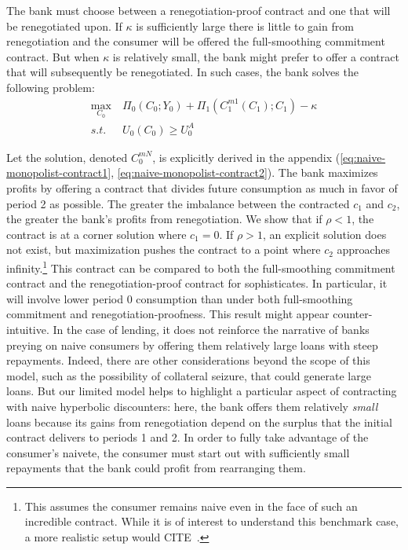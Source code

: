 \documentclass[11pt,english]{article}
\theoremstyle{plain}
\theoremstyle{definition}
\begin{document}
The bank must choose between a renegotiation-proof contract and one
that will be renegotiated upon. If $\kappa$ is sufficiently large
there is little to gain from renegotiation and the consumer will be
offered the full-smoothing commitment contract. But when $\kappa$
is relatively small, the bank might prefer to offer a contract that
will subsequently be renegotiated. In such cases, the bank solves
the following problem:
\begin{eqnarray}
\underset{C_{0}}{\text{max}} & \ \Pi_{0}\left(C_{0};Y_{0}\right)+\Pi_{1}\left(C_{1}^{m1}\left(C_{1}\right);C_{1}\right)-\kappa\\
s.t. & \ U_{0}\left(C_{0}\right)\geq U_{0}^{A}\label{eq:pc-n}
\end{eqnarray}

Let the solution, denoted $C_{0}^{mN}$, is explicitly derived
in the appendix (\ref{eq:naive-monopolist-contract1}, \ref{eq:naive-monopolist-contract2}).
The bank maximizes profits by offering a contract that divides future
consumption as much in favor of period 2 as possible. The greater
the imbalance between the contracted $c_{1}$ and $c_{2}$, the greater
the bank's profits from renegotiation. We show that if $\rho<1$,
the contract is at a corner solution where $c_{1}=0$. If $\rho>1$,
an explicit solution does not exist, but maximization pushes the contract
to a point where $c_{2}$ approaches infinity.\footnote{This assumes the consumer remains naive even in the face of such an incredible contract. While it is of interest to understand this benchmark case, a more realistic setup would \textbraceleft CITE\textbraceright\ .} This contract can be compared to both the full-smoothing commitment
contract and the renegotiation-proof contract for sophisticates. In
particular, it will involve lower period 0 consumption than under
both full-smoothing commitment and renegotiation-proofness. This result
might appear counter-intuitive. In the case of lending, it does not
reinforce the narrative of banks preying on naive consumers by offering
them relatively large loans with steep repayments. Indeed, there are
other considerations beyond the scope of this model, such as the possibility
of collateral seizure, that could generate large loans. But our limited
model helps to highlight a particular aspect of contracting with naive
hyperbolic discounters: here, the bank offers them relatively \emph{small}
loans because its gains from renegotiation depend on the surplus that
the initial contract delivers to periods 1 and 2. In order to fully
take advantage of the consumer's naivete, the consumer must start
out with sufficiently small repayments that the bank could profit
from rearranging them.
\end{document}
